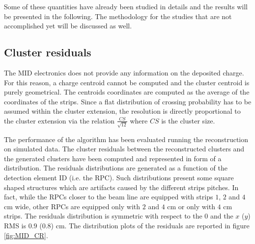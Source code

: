 Some of these quantities have already been studied in details and the results will be presented in the following.
The methodology for the studies that are not accomplished yet will be discussed as well.

\subsection{Cluster residuals}

The MID electronics does not provide any information on the deposited charge. 
For this reason, a charge centroid cannot be computed and the cluster centroid is purely geometrical.
The centroids coordinates are computed as the average of the coordinates of the strips.
Since a flat distribution of crossing probability has to be assumed within the cluster extension, the resolution is directly proportional to the cluster extension via the relation $\frac{CS}{\sqrt{12}}$ where $CS$ is the cluster size.

The performance of the algorithm has been evaluated running the reconstruction on simulated data.
The cluster residuals between the reconstructed clusters and the generated clusters have been computed and represented in form of a distribution.
The residuals distributions are generated as a function of the detection element ID (i.e. the RPC).
Such distributions present some square shaped structures which are artifacts caused by the different strips pitches.
In fact, while the RPCs closer to the beam line are equipped with strips $1$, $2$ and $4$ cm wide, other RPCs are equipped only with $2$ and $4$ cm or only with $4$ cm strips.
The residuals distribution is symmetric with respect to the $0$ and the $x$ ($y$) RMS is $0.9$ ($0.8$) cm.
The distribution plots of the residuals are reported in figure \ref{fig:MID_CR}.

